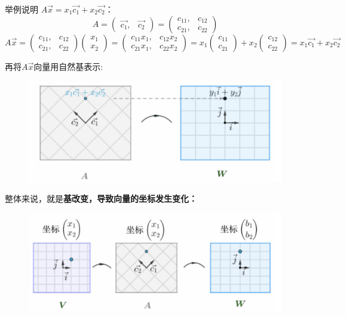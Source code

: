 \documentclass[12pt]{article}
\begin{document}
\begin{framed}  
举例说明 $A\vec{x}=x_1\vec{c_1}+x_2\vec{c_2}$：
$$
A = 
\begin{pmatrix}
\vec{c_1},&\vec{c_2}
\end{pmatrix} = 
\begin{pmatrix}
c_{11},&c_{12} \\
c_{21},&c_{22}
\end{pmatrix} 
$$
$$
A\vec{x} = 
\begin{pmatrix}
c_{11},&c_{12} \\
c_{21},&c_{22}
\end{pmatrix} 
\begin{pmatrix}
x_1 \\
x_2
\end{pmatrix} = 
\begin{pmatrix}
c_{11}x_1,&c_{12}x_2 \\
c_{21}x_1,&c_{22}x_2
\end{pmatrix} = 
x_1\begin{pmatrix}c_{11}\\c_{21}\end{pmatrix} + x_2\begin{pmatrix}c_{12}\\c_{22}\end{pmatrix} = x_1\vec{c_1}+x_2\vec{c_2}
$$
\end{framed}

再将$A\vec{x}$向量用自然基表示:
\begin{figure}[H]
\centering
\includegraphics[width=.8\textwidth]{fig/UnderstandMatrixMultiplication_7.png}
\end{figure}

整体来说，就是\textbf{基改变，导致向量的坐标发生变化：}
\begin{figure}[H]
\centering
\includegraphics[width=.8\textwidth]{fig/UnderstandMatrixMultiplication_8.png}
\end{figure}
\end{document}
